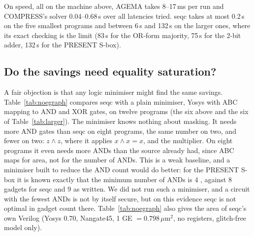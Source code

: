 \documentclass[conference]{IEEEtran}
\begin{document}
On speed, all on the machine above, AGEMA takes 8--17\,ms per run and COMPRESS's solver 0.04--0.68\,s over all latencies tried. seqc takes at most 0.2\,s on the five smallest programs and between 6\,s and 132\,s on the larger ones, where its exact checking is the limit (83\,s for the OR-form majority, 75\,s for the 2-bit adder, 132\,s for the PRESENT S-box).

\subsection{Do the savings need equality saturation?}
A fair objection is that any logic minimiser might find the same savings. Table~\ref{tab:noegraph} compares seqc with a plain minimiser, Yosys with ABC mapping to AND and XOR gates, on twelve programs (the six above and the six of Table~\ref{tab:larger}). The minimiser knows nothing about masking. It needs more AND gates than seqc on eight programs, the same number on two, and fewer on two: $z\wedge z$, where it applies $x\wedge x=x$, and the multiplier. On eight programs it even needs more ANDs than the source already had, since ABC maps for area, not for the number of ANDs. This is a weak baseline, and a minimiser built to reduce the AND count would do better: for the PRESENT S-box it is known exactly that the minimum number of ANDs is 4 \cite{courtois2011}, against 8 gadgets for seqc and 9 as written. We did not run such a minimiser, and a circuit with the fewest ANDs is not by itself secure, but on this evidence seqc is not optimal in gadget count there. Table~\ref{tab:noegraph} also gives the area of seqc's own Verilog (Yosys 0.70, Nangate45, 1 GE $=0.798\,\mu$m$^2$, no registers, glitch-free model only).
\end{document}
